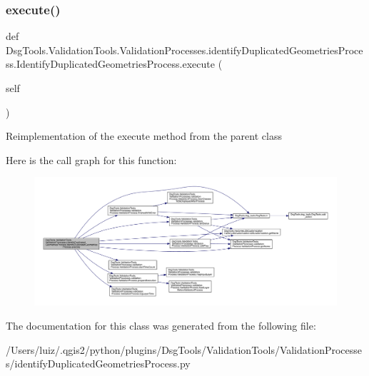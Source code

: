 \subsubsection{\texorpdfstring{execute()}{execute()}}
{\footnotesize\ttfamily def Dsg\+Tools.\+Validation\+Tools.\+Validation\+Processes.\+identify\+Duplicated\+Geometries\+Process.\+Identify\+Duplicated\+Geometries\+Process.\+execute (\begin{DoxyParamCaption}\item[{}]{self }\end{DoxyParamCaption})}

\begin{DoxyVerb}Reimplementation of the execute method from the parent class
\end{DoxyVerb}
 Here is the call graph for this function\+:
\nopagebreak
\begin{figure}[H]
\begin{center}
\leavevmode
\includegraphics[width=350pt]{class_dsg_tools_1_1_validation_tools_1_1_validation_processes_1_1identify_duplicated_geometries_55f3ef122508ca76ef1215b3f842280d_aecfd6be3d352a2e2c1888f25aa80ddfb_cgraph}
\end{center}
\end{figure}


The documentation for this class was generated from the following file\+:\begin{DoxyCompactItemize}
\item 
/\+Users/luiz/.\+qgis2/python/plugins/\+Dsg\+Tools/\+Validation\+Tools/\+Validation\+Processes/identify\+Duplicated\+Geometries\+Process.\+py\end{DoxyCompactItemize}
